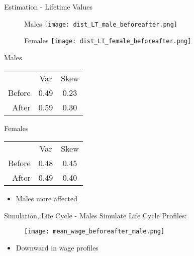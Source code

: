 \documentclass{beamer}
\begin{document}
\begin{frame}{Estimation - Lifetime Values}\label{EstimationLT}
\begin{figure}[!t]
\centering
\begin{minipage}[b]{0.48\textwidth}{Males}
\centering
\texttt{[image: dist\_LT\_male\_beforeafter.png]}
\end{minipage}
\begin{minipage}[b]{0.48\textwidth}{Females}
\centering
\texttt{[image: dist\_LT\_female\_beforeafter.png]}
\end{minipage}
\end{figure}
\begin{table}
\centering
\begin{minipage}[b]{0.48\textwidth}{Males}
\begin{tabular}{ r|c|c| }
\multicolumn{1}{r}{}
 &  \multicolumn{1}{c}{Var}
 & \multicolumn{1}{c}{Skew} \\
\cline{2-3}
Before & 0.49 & 0.23 \\
\cline{2-3}
After & 0.59 & 0.30 \\
\cline{2-3}
\end{tabular}
\end{minipage}
\begin{minipage}[b]{0.48\textwidth}{Females}
\begin{tabular}{ r|c|c| }
\multicolumn{1}{r}{}
 &  \multicolumn{1}{c}{Var}
 & \multicolumn{1}{c}{Skew} \\
\cline{2-3}
Before & 0.48 & 0.45 \\
\cline{2-3}
After & 0.49 & 0.40 \\
\cline{2-3}
\end{tabular}
\end{minipage}
\end{table}
\begin{itemize}
\setlength{\itemsep}{0.7 cm}
\item Males more affected
\end{itemize}
\hyperlink{LTEI_App}{}
\end{frame}

\begin{frame}{Simulation, Life Cycle - Males}\label{EstimationLCMalesI}
Simulate Life Cycle Profiles:
\begin{figure}[!t]
\centering
\begin{minipage}[b]{1\textwidth}{}
\centering
\texttt{[image: mean\_wage\_beforeafter\_male.png]}
\end{minipage}
\end{figure}
\begin{itemize}
\setlength{\itemsep}{0.7 cm}
\item Downward in wage profiles
\end{itemize}
\end{frame}
\end{document}

